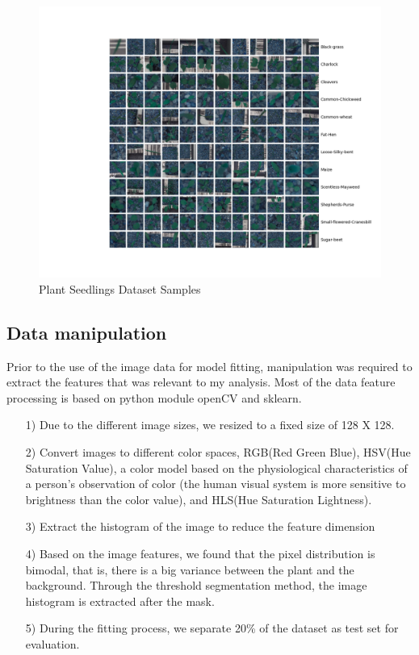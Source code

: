 \documentclass[11pt]{article}
\begin{document}
\begin{center}
\begin{figure}[htb]
\centering 
\includegraphics[width=13cm]{sample_images.png}
\caption{Plant Seedlings Dataset Samples}
\end{figure}
\end{center}

\subsection{Data manipulation}
Prior to the use of the image data for model fitting, manipulation was required to extract the features that was relevant to my analysis. Most of the data feature processing is based on python module openCV\cite{Robotic Weed Control System for Tomatoes} and sklearn\cite{Robotic Weed Control System for Tomatoes}.
\begin{itemize}
\item[1)] Due to the different image sizes, we resized to a fixed size of 128 X 128.
\item[2)] Convert images to different color spaces, RGB(Red Green Blue), HSV(Hue Saturation Value), a color model based on the physiological characteristics of a person's observation of color (the human visual system is more sensitive to brightness than the color value), and HLS(Hue Saturation Lightness). 
\item[3)] Extract the histogram of the image to reduce the feature dimension
\item[4)] Based on the image features, we found that the pixel distribution is bimodal, that is, there is a big variance between the plant and the background. Through the threshold segmentation method, the image histogram is extracted after the mask.
\item[5)] During the fitting process, we separate 20\% of the dataset as test set for evaluation.
\end{itemize}
\end{document}
